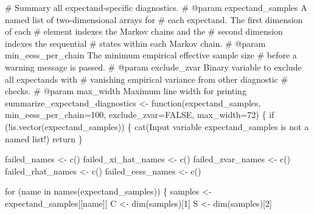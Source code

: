 \documentclass[
  letterpaper,
  DIV=11,
  numbers=noendperiod]{scrartcl}
\newenvironment{Shaded}{\begin{snugshade}}{\end{snugshade}}
\newcommand{\AttributeTok}[1]{\textcolor[rgb]{0.40,0.45,0.13}{#1}}
\newcommand{\CommentTok}[1]{\textcolor[rgb]{0.37,0.37,0.37}{#1}}
\newcommand{\ConstantTok}[1]{\textcolor[rgb]{0.56,0.35,0.01}{#1}}
\newcommand{\ControlFlowTok}[1]{\textcolor[rgb]{0.00,0.23,0.31}{#1}}
\newcommand{\DecValTok}[1]{\textcolor[rgb]{0.68,0.00,0.00}{#1}}
\newcommand{\FunctionTok}[1]{\textcolor[rgb]{0.28,0.35,0.67}{#1}}
\newcommand{\NormalTok}[1]{\textcolor[rgb]{0.00,0.23,0.31}{#1}}
\newcommand{\OtherTok}[1]{\textcolor[rgb]{0.00,0.23,0.31}{#1}}
\newcommand{\SpecialCharTok}[1]{\textcolor[rgb]{0.37,0.37,0.37}{#1}}
\newcommand{\StringTok}[1]{\textcolor[rgb]{0.13,0.47,0.30}{#1}}
\begin{document}
\begin{Shaded}
\begin{Highlighting}[]
\CommentTok{\# Summary all expectand{-}specific diagnostics.}
\CommentTok{\# @param expectand\_samples A named list of two{-}dimensional arrays for }
\CommentTok{\#                          each expectand.  The first dimension of each}
\CommentTok{\#                          element indexes the Markov chains and the }
\CommentTok{\#                          second dimension indexes the sequential }
\CommentTok{\#                          states within each Markov chain.}
\CommentTok{\# @param min\_eess\_per\_chain The minimum empirical effective sample size}
\CommentTok{\#                           before a warning message is passed.}
\CommentTok{\# @param exclude\_zvar Binary variable to exclude all expectands with}
\CommentTok{\#                     vanishing empirical variance from other diagnostic}
\CommentTok{\#                     checks.}
\CommentTok{\# @param max\_width Maximum line width for printing}
\NormalTok{summarize\_expectand\_diagnostics }\OtherTok{\textless{}{-}} \ControlFlowTok{function}\NormalTok{(expectand\_samples,}
                                            \AttributeTok{min\_eess\_per\_chain=}\DecValTok{100}\NormalTok{,}
                                            \AttributeTok{exclude\_zvar=}\ConstantTok{FALSE}\NormalTok{,}
                                            \AttributeTok{max\_width=}\DecValTok{72}\NormalTok{) \{}
  \ControlFlowTok{if}\NormalTok{ (}\SpecialCharTok{!}\FunctionTok{is.vector}\NormalTok{(expectand\_samples)) \{}
    \FunctionTok{cat}\NormalTok{(}\StringTok{\textquotesingle{}Input variable \textasciigrave{}expectand\_samples\textasciigrave{} is not a named list!\textquotesingle{}}\NormalTok{)}
\NormalTok{    return}
\NormalTok{  \}}

\NormalTok{  failed\_names }\OtherTok{\textless{}{-}} \FunctionTok{c}\NormalTok{()}
\NormalTok{  failed\_xi\_hat\_names }\OtherTok{\textless{}{-}} \FunctionTok{c}\NormalTok{()}
\NormalTok{  failed\_zvar\_names }\OtherTok{\textless{}{-}} \FunctionTok{c}\NormalTok{()}
\NormalTok{  failed\_rhat\_names }\OtherTok{\textless{}{-}} \FunctionTok{c}\NormalTok{()}
\NormalTok{  failed\_eess\_names }\OtherTok{\textless{}{-}} \FunctionTok{c}\NormalTok{()}

  \ControlFlowTok{for}\NormalTok{ (name }\ControlFlowTok{in} \FunctionTok{names}\NormalTok{(expectand\_samples)) \{}
\NormalTok{    samples }\OtherTok{\textless{}{-}}\NormalTok{ expectand\_samples[[name]]}
\NormalTok{    C }\OtherTok{\textless{}{-}} \FunctionTok{dim}\NormalTok{(samples)[}\DecValTok{1}\NormalTok{]}
\NormalTok{    S }\OtherTok{\textless{}{-}} \FunctionTok{dim}\NormalTok{(samples)[}\DecValTok{2}\NormalTok{]}
    

\end{Highlighting}
\end{Shaded}
\end{document}
